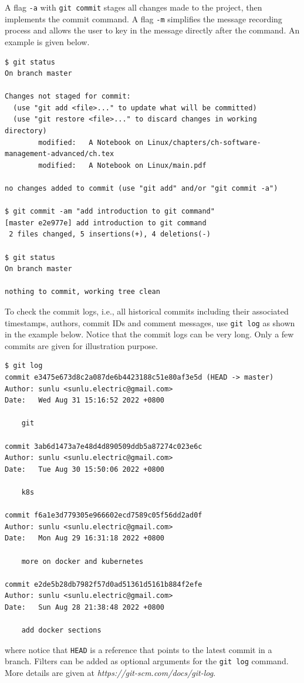 A flag \verb|-a| with \verb|git commit| stages all changes made to the project, then implements the commit command. A flag \verb|-m| simplifies the message recording process and allows the user to key in the message directly after the command. An example is given below.
\begin{lstlisting}
$ git status
On branch master

Changes not staged for commit:
  (use "git add <file>..." to update what will be committed)
  (use "git restore <file>..." to discard changes in working directory)
        modified:   A Notebook on Linux/chapters/ch-software-management-advanced/ch.tex
        modified:   A Notebook on Linux/main.pdf

no changes added to commit (use "git add" and/or "git commit -a")

$ git commit -am "add introduction to git command"
[master e2e977e] add introduction to git command
 2 files changed, 5 insertions(+), 4 deletions(-)

$ git status
On branch master

nothing to commit, working tree clean
\end{lstlisting}

To check the commit logs, i.e., all historical commits including their associated timestamps, authors, commit IDs and comment messages, use \verb|git log| as shown in the example below. Notice that the commit logs can be very long. Only a few commits are given for illustration purpose.
\begin{lstlisting}
$ git log
commit e3475e673d8c2a087de6b4423188c51e80af3e5d (HEAD -> master)
Author: sunlu <sunlu.electric@gmail.com>
Date:   Wed Aug 31 15:16:52 2022 +0800

    git

commit 3ab6d1473a7e48d4d890509ddb5a87274c023e6c
Author: sunlu <sunlu.electric@gmail.com>
Date:   Tue Aug 30 15:50:06 2022 +0800

    k8s

commit f6a1e3d779305e966602ecd7589c05f56dd2ad0f
Author: sunlu <sunlu.electric@gmail.com>
Date:   Mon Aug 29 16:31:18 2022 +0800

    more on docker and kubernetes

commit e2de5b28db7982f57d0ad51361d5161b884f2efe
Author: sunlu <sunlu.electric@gmail.com>
Date:   Sun Aug 28 21:38:48 2022 +0800

    add docker sections
\end{lstlisting}
where notice that \verb|HEAD| is a reference that points to the latest commit in a branch. Filters can be added as optional arguments for the \verb|git log| command. More details are given at \textit{https://git-scm.com/docs/git-log}.

